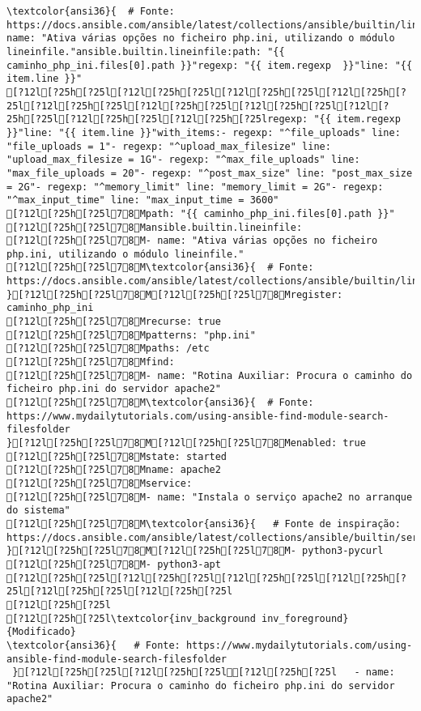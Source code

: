 \documentclass{scrartcl}
\begin{document}
\begin{Verbatim}
\textcolor{ansi36}{  # Fonte: https://docs.ansible.com/ansible/latest/collections/ansible/builtin/lineinfile_module.html}- name: "Ativa várias opções no ficheiro php.ini, utilizando o módulo lineinfile."ansible.builtin.lineinfile:path: "{{ caminho_php_ini.files[0].path }}"regexp: "{{ item.regexp  }}"line: "{{ item.line }}"
[?12l[?25h[?25l[?12l[?25h[?25l[?12l[?25h[?25l[?12l[?25h[?25l[?12l[?25h[?25l[?12l[?25h[?25l[?12l[?25h[?25l[?12l[?25h[?25l[?12l[?25h[?25l[?12l[?25h[?25lregexp: "{{ item.regexp  }}"line: "{{ item.line }}"with_items:- regexp: "^file_uploads" line: "file_uploads = 1"- regexp: "^upload_max_filesize" line: "upload_max_filesize = 1G"- regexp: "^max_file_uploads" line: "max_file_uploads = 20"- regexp: "^post_max_size" line: "post_max_size = 2G"- regexp: "^memory_limit" line: "memory_limit = 2G"- regexp: "^max_input_time" line: "max_input_time = 3600"
[?12l[?25h[?25l78Mpath: "{{ caminho_php_ini.files[0].path }}"
[?12l[?25h[?25l78Mansible.builtin.lineinfile:
[?12l[?25h[?25l78M- name: "Ativa várias opções no ficheiro php.ini, utilizando o módulo lineinfile."
[?12l[?25h[?25l78M\textcolor{ansi36}{  # Fonte: https://docs.ansible.com/ansible/latest/collections/ansible/builtin/lineinfile_module.html
}[?12l[?25h[?25l78M[?12l[?25h[?25l78Mregister: caminho_php_ini
[?12l[?25h[?25l78Mrecurse: true
[?12l[?25h[?25l78Mpatterns: "php.ini"
[?12l[?25h[?25l78Mpaths: /etc
[?12l[?25h[?25l78Mfind:
[?12l[?25h[?25l78M- name: "Rotina Auxiliar: Procura o caminho do ficheiro php.ini do servidor apache2"
[?12l[?25h[?25l78M\textcolor{ansi36}{  # Fonte: https://www.mydailytutorials.com/using-ansible-find-module-search-filesfolder
}[?12l[?25h[?25l78M[?12l[?25h[?25l78Menabled: true
[?12l[?25h[?25l78Mstate: started
[?12l[?25h[?25l78Mname: apache2
[?12l[?25h[?25l78Mservice:
[?12l[?25h[?25l78M- name: "Instala o serviço apache2 no arranque do sistema"
[?12l[?25h[?25l78M\textcolor{ansi36}{   # Fonte de inspiração: https://docs.ansible.com/ansible/latest/collections/ansible/builtin/service_module.html
}[?12l[?25h[?25l78M[?12l[?25h[?25l78M- python3-pycurl
[?12l[?25h[?25l78M- python3-apt
[?12l[?25h[?25l[?12l[?25h[?25l[?12l[?25h[?25l[?12l[?25h[?25l[?12l[?25h[?25l[?12l[?25h[?25l
[?12l[?25h[?25l
[?12l[?25h[?25l\textcolor{inv_background inv_foreground}{Modificado}
\textcolor{ansi36}{   # Fonte: https://www.mydailytutorials.com/using-ansible-find-module-search-filesfolder
 }[?12l[?25h[?25l[?12l[?25h[?25l[?12l[?25h[?25l   - name: "Rotina Auxiliar: Procura o caminho do ficheiro php.ini do servidor apache2"

\end{Verbatim}
\end{document}

